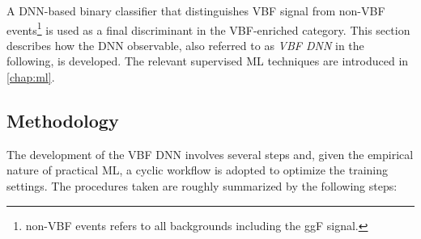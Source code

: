 A DNN-based binary classifier that distinguishes VBF signal from non-VBF events\footnote{non-VBF events refers to all backgrounds including the ggF signal.} is used as a final discriminant in the VBF-enriched \TwoJet category.
This section describes how the DNN observable, also referred to as \emph{VBF DNN} in the following, is developed.
The relevant supervised ML techniques are introduced in \cref{chap:ml}.

\subsection{Methodology}
The development of the VBF DNN involves several steps and, given the empirical nature of practical ML, a cyclic workflow is adopted to optimize the training settings.
The procedures taken are roughly summarized by the following steps:

